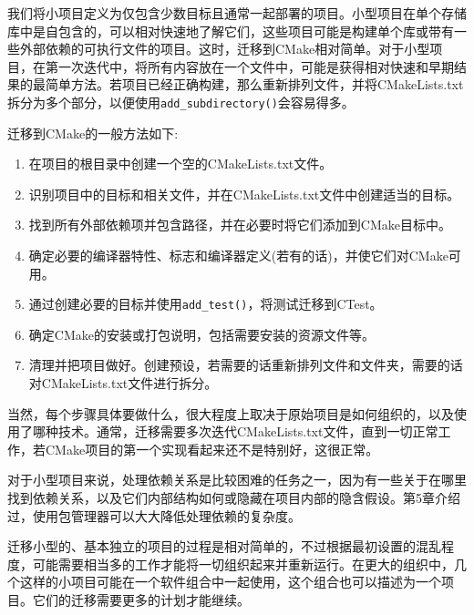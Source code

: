 我们将小项目定义为仅包含少数目标且通常一起部署的项目。小型项目在单个存储库中是自包含的，可以相对快速地了解它们，这些项目可能是构建单个库或带有一些外部依赖的可执行文件的项目。这时，迁移到CMake相对简单。对于小型项目，在第一次迭代中，将所有内容放在一个文件中，可能是获得相对快速和早期结果的最简单方法。若项目已经正确构建，那么重新排列文件，并将CMakeLists.txt拆分为多个部分，以便使用\texttt{add\_subdirectory()}会容易得多。

迁移到CMake的一般方法如下:

\begin{enumerate}
\item 
在项目的根目录中创建一个空的CMakeLists.txt文件。

\item 
识别项目中的目标和相关文件，并在CMakeLists.txt文件中创建适当的目标。

\item 
找到所有外部依赖项并包含路径，并在必要时将它们添加到CMake目标中。

\item 
确定必要的编译器特性、标志和编译器定义(若有的话)，并使它们对CMake可用。

\item 
通过创建必要的目标并使用\texttt{add\_test()}，将测试迁移到CTest。

\item 
确定CMake的安装或打包说明，包括需要安装的资源文件等。

\item 
清理并把项目做好。创建预设，若需要的话重新排列文件和文件夹，需要的话对CMakeLists.txt文件进行拆分。
\end{enumerate}

当然，每个步骤具体要做什么，很大程度上取决于原始项目是如何组织的，以及使用了哪种技术。通常，迁移需要多次迭代CMakeLists.txt文件，直到一切正常工作，若CMake项目的第一个实现看起来还不是特别好，这很正常。

对于小型项目来说，处理依赖关系是比较困难的任务之一，因为有一些关于在哪里找到依赖关系，以及它们内部结构如何或隐藏在项目内部的隐含假设。第5章介绍过，使用包管理器可以大大降低处理依赖的复杂度。

迁移小型的、基本独立的项目的过程是相对简单的，不过根据最初设置的混乱程度，可能需要相当多的工作才能将一切组织起来并重新运行。在更大的组织中，几个这样的小项目可能在一个软件组合中一起使用，这个组合也可以描述为一个项目。它们的迁移需要更多的计划才能继续。















































